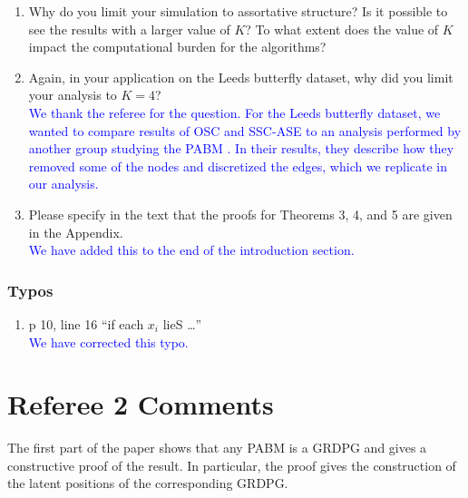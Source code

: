 \documentclass[
]{article}
\providecommand{\tightlist}{%
  \setlength{\itemsep}{0pt}\setlength{\parskip}{0pt}}
\begin{document}
\begin{enumerate}
\item
  Why do you limit your simulation to assortative structure? Is it
  possible to see the results with a larger value of \(K\)? To what
  extent does the value of \(K\) impact the computational burden for the
  algorithms?
\item
  Again, in your application on the Leeds butterfly dataset, why did you
  limit your analysis to \(K = 4\)?\\
  \textcolor{blue}{
  We thank the referee for the question. 
  For the Leeds butterfly dataset, we wanted to compare results of OSC and SSC-ASE to an analysis performed by another group studying the PABM \citep{noroozi2019estimation}. 
  In their results, they describe how they removed some of the nodes and discretized the edges, which we replicate in our analysis. 
  }
\item
  Please specify in the text that the proofs for Theorems 3, 4, and 5
  are given in the Appendix.\\
  \textcolor{blue}{
  We have added this to the end of the introduction section.
  }
\end{enumerate}

\hypertarget{typos}{%
\subsubsection{Typos}\label{typos}}

\begin{enumerate}
\def\labelenumi{\arabic{enumi}.}
\tightlist
\item
  p 10, line 16 ``if each \(x_i\) lieS \ldots{}''\\
  \textcolor{blue}{
  We have corrected this typo. 
  }
\end{enumerate}

\hypertarget{referee-2-comments}{%
\section{Referee 2 Comments}\label{referee-2-comments}}

The first part of the paper shows that any PABM is a GRDPG and gives a
constructive proof of the result. In particular, the proof gives the
construction of the latent positions of the corresponding GRDPG.
\end{document}
